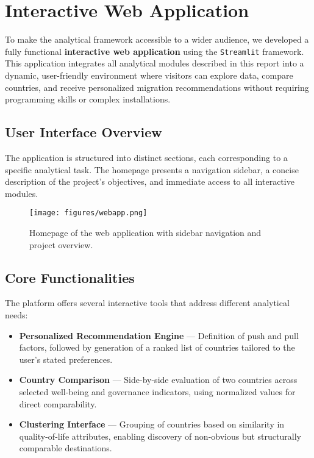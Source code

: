 \documentclass[11pt]{article}
\begin{document}
\newpage

\section{Interactive Web Application}

\noindent
To make the analytical framework accessible to a wider audience, we developed a fully functional \textbf{interactive web application} using the \texttt{Streamlit} framework.
This application integrates all analytical modules described in this report into a dynamic, user-friendly environment where visitors can explore data, compare countries, and receive personalized migration recommendations without requiring programming skills or complex installations.

\subsection{User Interface Overview}

\noindent
The application is structured into distinct sections, each corresponding to a specific analytical task. The homepage presents a navigation sidebar, a concise description of the project’s objectives, and immediate access to all interactive modules.

\begin{figure}[H]
\centering
\texttt{[image: figures/webapp.png]}
\caption{Homepage of the web application with sidebar navigation and project overview.}
\end{figure}

\subsection{Core Functionalities}

\noindent
The platform offers several interactive tools that address different analytical needs:
\begin{itemize}
\item \textbf{Personalized Recommendation Engine} — Definition of push and pull factors, followed by generation of a ranked list of countries tailored to the user’s stated preferences.
\item \textbf{Country Comparison} — Side-by-side evaluation of two countries across selected well-being and governance indicators, using normalized values for direct comparability.
\item \textbf{Clustering Interface} — Grouping of countries based on similarity in quality-of-life attributes, enabling discovery of non-obvious but structurally comparable destinations.
\end{itemize}
\end{document}

